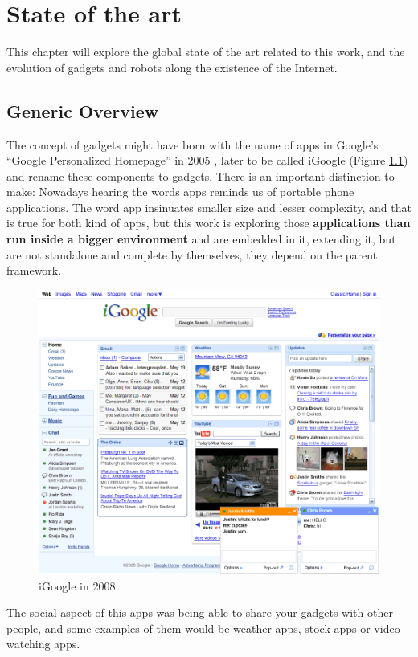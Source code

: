 \newpage
\thispagestyle{sectioned}
\chapter{State of the art}
This chapter will explore the global state of the art related to this work, and the evolution of gadgets and robots along the existence of the Internet.
\section{Generic Overview}
The concept of gadgets might have born with the name of apps in Google's ``Google Personalized Homepage'' in 2005 \cite{ref:what_happened_to_igoogle}, later to be called iGoogle (Figure \ref{fig:igoogle_2008}) and rename these components to gadgets. There is an important distinction to make: Nowadays hearing the words apps reminds us of portable phone applications. The word app insinuates smaller size and lesser complexity, and that is true for both kind of apps, but this work is exploring those \textbf{applications than run inside a bigger environment} and are embedded in it, extending it, but are not standalone and complete by themselves, they depend on the parent framework.
\begin{figure}[h]
  \center
    \includegraphics[keepaspectratio, scale=0.6]{Media/Captures/Soa/iGoogle.png}
  \caption{iGoogle in 2008}
  \label{fig:igoogle_2008}
\end{figure}
The social aspect of this apps was being able to share your gadgets with other people, and some examples of them would be weather apps, stock apps or video-watching apps.\\[.2cm]
